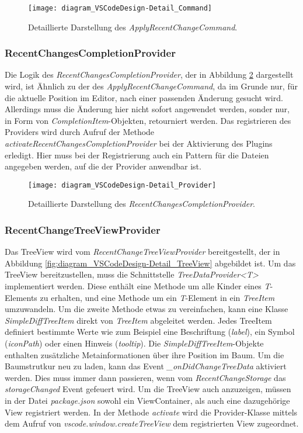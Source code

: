 \begin{figure}
    \centering
    \texttt{[image: diagram\_VSCodeDesign-Detail\_Command]}
    \caption{Detaillierte Darstellung des \emph{ApplyRecentChangeCommand}.}
    \label{fig:diagram_VSCodeDesign-Detail_Command}
\end{figure}   

\subsubsection{RecentChangesCompletionProvider}

Die Logik des \emph{RecentChangesCompletionProvider}, 
der in Abbildung \ref{fig:diagram_VSCodeDesign-Detail_Provider} dargestellt wird,
ist Ähnlich
zu der des \emph{ApplyRecentChangeCommand}, da im Grunde nur, für
die aktuelle Position im Editor, nach einer passenden Änderung 
gesucht wird. Allerdings muss die Änderung hier nicht sofort
angewendet werden, sonder nur, in Form von \emph{CompletionItem}-Objekten,
retourniert werden. Das registrieren des Providers wird durch
Aufruf der Methode \emph{activateRecentChangesCompletionProvider} bei
der Aktivierung des Plugins erledigt. Hier muss bei der Registrierung
auch ein Pattern für die Dateien angegeben werden, auf die der Provider
anwendbar ist.

\begin{figure}
    \centering
    \texttt{[image: diagram\_VSCodeDesign-Detail\_Provider]}
    \caption{Detaillierte Darstellung des \emph{RecentChangesCompletionProvider}.}
    \label{fig:diagram_VSCodeDesign-Detail_Provider}
\end{figure}   

\subsubsection{RecentChangeTreeViewProvider}

Das TreeView wird vom \emph{RecentChangeTreeViewProvider} bereitgestellt,
der in Abbildung \ref{fig:diagram_VSCodeDesign-Detail_TreeView} abgebildet ist.
Um das TreeView bereitzustellen, muss die Schnittstelle
\emph{TreeDataProvider<T>} implementiert werden. Diese
enthält eine Methode um alle Kinder eines \emph{T}-Elements
zu erhalten, und eine Methode um ein \emph{T}-Element in
ein \emph{TreeItem} umzuwandeln. Um die zweite Methode etwas zu
vereinfachen, kann eine Klasse \emph{SimpleDiffTreeItem} direkt
von \emph{TreeItem} abgeleitet werden. Jedes TreeItem definiert
bestimmte Werte wie zum Beispiel eine Beschriftung (\emph{label}), 
ein Symbol (\emph{iconPath}) oder einen Hinweis (\emph{tooltip}).
Die \emph{SimpleDiffTreeItem}-Objekte enthalten zusätzliche
Metainformationen über ihre Position im Baum. Um die Baumstrutkur
neu zu laden, kann das Event \emph{\_onDidChangeTreeData} aktiviert
werden. Dies muss immer dann passieren, wenn vom \emph{RecentChangeStorage}
das \emph{storageChanged} Event gefeuert wird.
Um die TreeView auch anzuzeigen, müssen in der Datei \emph{package.json}
sowohl ein ViewContainer, als auch eine dazugehörige View registriert werden.
In der Methode \emph{activate} wird die Provider-Klasse mittels
dem Aufruf von \emph{vscode.window.createTreeView} dem registrierten
View zugeordnet.

